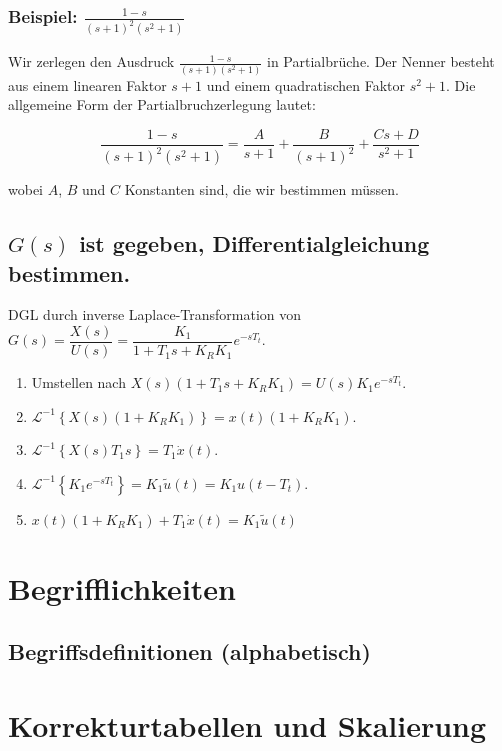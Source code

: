 \documentclass[12pt]{article}
\begin{document}
\subsubsection{Beispiel: \(\frac{1 - s}{(s + 1)^2(s^2 + 1)}\)}
Wir zerlegen den Ausdruck \(\frac{1 - s}{(s + 1)(s^2 + 1)}\) in Partialbrüche. Der Nenner besteht aus einem linearen Faktor \(s + 1\) und einem quadratischen Faktor \(s^2 + 1\). Die allgemeine Form der Partialbruchzerlegung lautet:

\[
\frac{1 - s}{(s + 1)^2(s^2 + 1)} = \frac{A}{s + 1} + \frac{B}{(s + 1)^2} + \frac{Cs + D}{s^2 + 1}
\]

wobei \(A\), \(B\) und \(C\) Konstanten sind, die wir bestimmen müssen.


\subsection{ \(G(s)\) ist gegeben, Differentialgleichung bestimmen.}

DGL durch inverse Laplace-Transformation von \( G(s) =\dfrac{X(s)}{U(s)}= \dfrac{K_1}{1 + T_1 s + K_R K_1} e^{-sT_t} \).

\begin{enumerate}[label=\arabic*.]
    \item Umstellen nach \( X(s)(1 + T_1 s + K_R K_1) = U(s)K_1 e^{-sT_t}\).
    \item \(\mathcal{L}^{-1} \left\{ X(s)(1 + K_RK_1) \right\} = x(t)(1 + K_RK_1)\).
    \item \(\mathcal{L}^{-1} \left\{ X(s)T_1s \right\} = T_1\dot{x}(t)\).
    \item \(\mathcal{L}^{-1} \left\{ K_1e^{-sT_t} \right\} = K_1 \tilde{u} (t) = K_1 {u} (t-T_t)\).
    \item \(x(t)(1 + K_RK_1)+T_1\dot{x}(t)= K_1 \tilde{u} (t)\)
\end{enumerate}

\newpage
\section{Begrifflichkeiten}
\subsection{Begriffsdefinitionen (alphabetisch)}
\newpage
\section{Korrekturtabellen und Skalierung}
\end{document}
